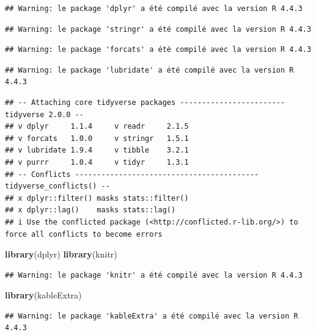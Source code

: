 \documentclass[
  12pt,
]{article}
\newenvironment{Shaded}{\begin{snugshade}}{\end{snugshade}}
\newcommand{\FunctionTok}[1]{\textcolor[rgb]{0.13,0.29,0.53}{\textbf{#1}}}
\newcommand{\NormalTok}[1]{#1}
\begin{document}
\begin{verbatim}
## Warning: le package 'dplyr' a été compilé avec la version R 4.4.3
\end{verbatim}

\begin{verbatim}
## Warning: le package 'stringr' a été compilé avec la version R 4.4.3
\end{verbatim}

\begin{verbatim}
## Warning: le package 'forcats' a été compilé avec la version R 4.4.3
\end{verbatim}

\begin{verbatim}
## Warning: le package 'lubridate' a été compilé avec la version R 4.4.3
\end{verbatim}

\begin{verbatim}
## -- Attaching core tidyverse packages ------------------------ tidyverse 2.0.0 --
## v dplyr     1.1.4     v readr     2.1.5
## v forcats   1.0.0     v stringr   1.5.1
## v lubridate 1.9.4     v tibble    3.2.1
## v purrr     1.0.4     v tidyr     1.3.1
## -- Conflicts ------------------------------------------ tidyverse_conflicts() --
## x dplyr::filter() masks stats::filter()
## x dplyr::lag()    masks stats::lag()
## i Use the conflicted package (<http://conflicted.r-lib.org/>) to force all conflicts to become errors
\end{verbatim}

\begin{Shaded}
\begin{Highlighting}[]
\FunctionTok{library}\NormalTok{(dplyr)}
\FunctionTok{library}\NormalTok{(knitr)}
\end{Highlighting}
\end{Shaded}

\begin{verbatim}
## Warning: le package 'knitr' a été compilé avec la version R 4.4.3
\end{verbatim}

\begin{Shaded}
\begin{Highlighting}[]
\FunctionTok{library}\NormalTok{(kableExtra)}
\end{Highlighting}
\end{Shaded}

\begin{verbatim}
## Warning: le package 'kableExtra' a été compilé avec la version R 4.4.3
\end{verbatim}
\end{document}
